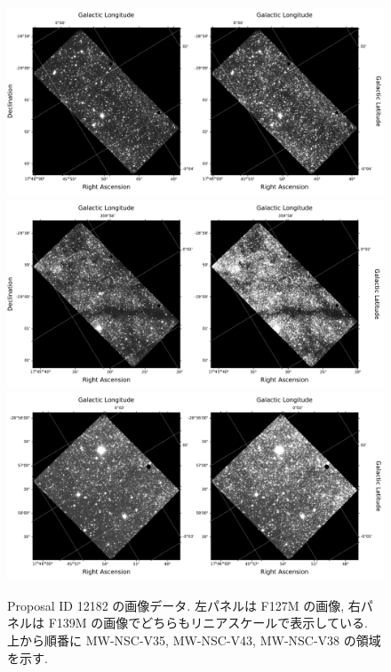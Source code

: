 \documentclass[10pt,a4paper,dvipdfmx,uplatex]{jsarticle}
\begin{document}
\begin{figure}
  \centering
  \includegraphics[width=\linewidth]{img/hst_12182_46_wfc3_ir_f127m_drz.pdf}
  \includegraphics[width=\linewidth]{img/hst_12182_47_wfc3_ir_f127m_drz.pdf}
  \includegraphics[width=\linewidth]{img/hst_12182_48_wfc3_ir_f127m_drz.pdf}
  \caption{Proposal ID 12182 の画像データ. 左パネルは F127M の画像, 右パネルは F139M の画像でどちらもリニアスケールで表示している. 上から順番に MW-NSC-V35, MW-NSC-V43, MW-NSC-V38 の領域を示す.}
  \label{fig:12182a}
\end{figure}
\end{document}
